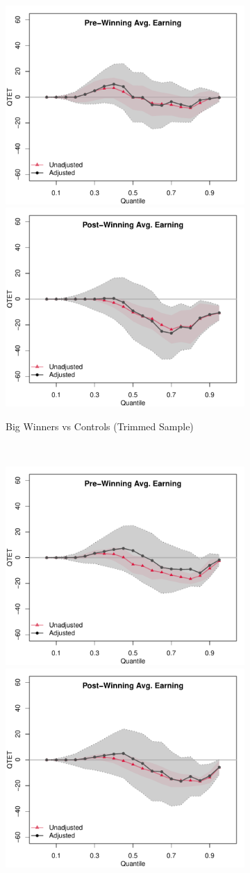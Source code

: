 \documentclass[letterpaper,12pt,leqno]{article}
\begin{document}
\begin{figure}[!ht]
    \caption{Quantile Treatment Effects: IRS Data}\label{fig:qte.irs}
    \begin{minipage}[c]{1\textwidth}
        \centering
        \begin{subfigure}{1\linewidth}\hspace{1em}
            \includegraphics[width=0.45\linewidth]{irs1_qte_pre.pdf}\hspace{1em}
            \includegraphics[width=0.45\linewidth]{irs1_qte_pst.pdf}
            \caption{Big Winners vs Controls (Trimmed Sample)}
        \end{subfigure}\\
        \begin{subfigure}{1\linewidth}\hspace{1em}
            \includegraphics[width=0.45\linewidth]{irs2_qte_pre.pdf}\hspace{1em}
            \includegraphics[width=0.45\linewidth]{irs2_qte_pst.pdf}

\end{subfigure}
\end{minipage}
\end{figure}
\end{document}
